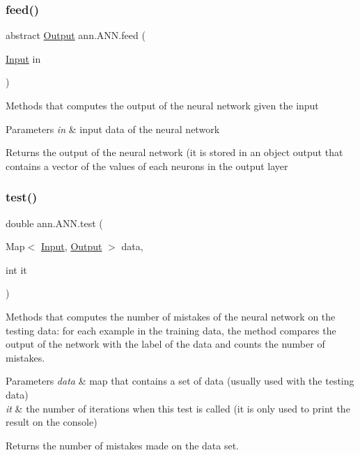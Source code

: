 \subsubsection{\texorpdfstring{feed()}{feed()}}
{\footnotesize\ttfamily abstract \hyperlink{classann_1_1_output}{Output} ann.\+A\+N\+N.\+feed (\begin{DoxyParamCaption}\item[{\hyperlink{classann_1_1_input}{Input}}]{in }\end{DoxyParamCaption})\hspace{0.3cm}{\ttfamily [abstract]}}

Methods that computes the output of the neural network given the input 
\begin{DoxyParams}{Parameters}
{\em in} & input data of the neural network \\
\hline
\end{DoxyParams}
\begin{DoxyReturn}{Returns}
the output of the neural network (it is stored in an object output that contains a vector of the values of each neurons in the output layer 
\end{DoxyReturn}
\mbox{\label{classann_1_1_a_n_n_aa7ab72312b84e639aa84b6fbee5c9df1}} 
\subsubsection{\texorpdfstring{test()}{test()}}
{\footnotesize\ttfamily double ann.\+A\+N\+N.\+test (\begin{DoxyParamCaption}\item[{Map$<$ \hyperlink{classann_1_1_input}{Input}, \hyperlink{classann_1_1_output}{Output} $>$}]{data,  }\item[{int}]{it }\end{DoxyParamCaption})}

Methods that computes the number of mistakes of the neural network on the testing data\+: for each example in the training data, the method compares the output of the network with the label of the data and counts the number of mistakes. 
\begin{DoxyParams}{Parameters}
{\em data} & map that contains a set of data (usually used with the testing data) \\
\hline
{\em it} & the number of iterations when this test is called (it is only used to print the result on the console) \\
\hline
\end{DoxyParams}
\begin{DoxyReturn}{Returns}
the number of mistakes made on the data set. 
\end{DoxyReturn}
\mbox{\label{classann_1_1_a_n_n_a9e4c633b9b365c89245bbb441c86d71c}} 
